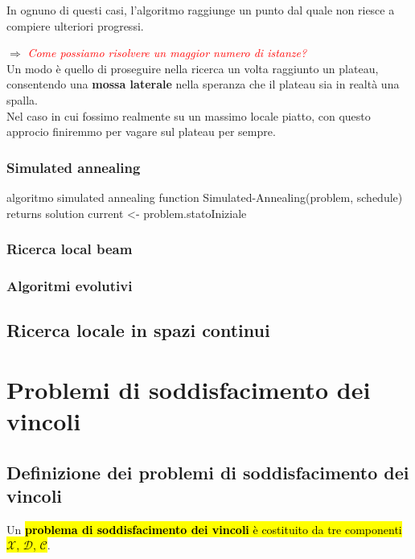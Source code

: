 \documentclass[12pt, a4paper, oneside]{book}
\begin{document}
    In ognuno di questi casi, l'algoritmo raggiunge un punto dal quale non riesce a compiere ulteriori progressi.

    $\Rightarrow$ \textit{\textcolor{red}{Come possiamo risolvere un maggior numero di istanze?}} \\[0.2ex]
    Un modo è quello di proseguire nella ricerca un volta raggiunto un plateau, consentendo una \textbf{mossa laterale} nella speranza che il plateau sia in realtà una spalla. \\[0.2ex]
    Nel caso in cui fossimo realmente su un massimo locale piatto, con questo approcio finiremmo per vagare sul plateau per sempre.

    \subsection{Simulated annealing}

    \begin{codice}[python]{algoritmo simulated annealing}
      function Simulated-Annealing(problem, schedule) returns solution
        current <- problem.statoIniziale
    \end{codice}

    \subsection{Ricerca local beam}

    \subsection{Algoritmi evolutivi}


    \section{Ricerca locale in spazi continui}





    \chapter{Problemi di soddisfacimento dei vincoli}

    \section{Definizione dei problemi di soddisfacimento dei vincoli}
    Un \hl{\textbf{problema di soddisfacimento dei vincoli} è costituito da tre componenti $\mathcal{X}$, $\mathcal{D}$, $\mathcal{C}$}.
\end{document}
